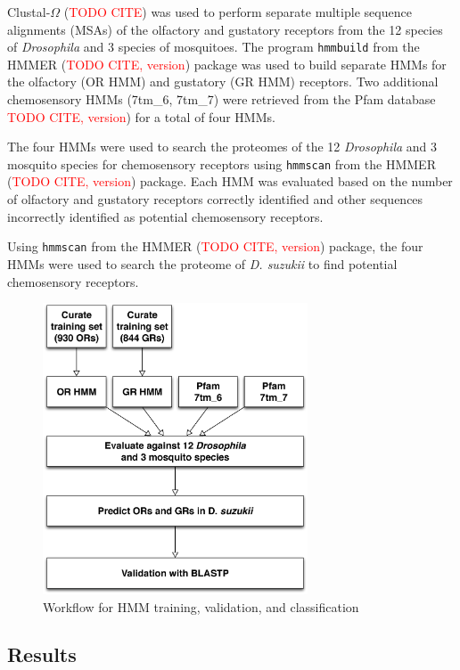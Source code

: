 Clustal-$\Omega$ (\textcolor{red}{TODO CITE}) was used to perform separate multiple sequence alignments (MSAs) of the olfactory and gustatory receptors from the 12 species of \emph{Drosophila} and 3 species of mosquitoes.  The program \texttt{hmmbuild} from the HMMER (\textcolor{red}{TODO CITE, version}) package was used to build separate HMMs for the olfactory (OR HMM) and gustatory (GR HMM) receptors.  Two additional chemosensory HMMs (7tm\_6, 7tm\_7) were retrieved from the Pfam database \textcolor{red}{TODO CITE, version}) for a total of four HMMs.

The four HMMs were used to search the proteomes of the 12 \emph{Drosophila} and 3 mosquito species for chemosensory receptors using \texttt{hmmscan} from the HMMER (\textcolor{red}{TODO CITE, version}) package.  Each HMM was evaluated based on the number of olfactory and gustatory receptors correctly identified and other sequences incorrectly identified as potential chemosensory receptors.

Using \texttt{hmmscan} from the HMMER (\textcolor{red}{TODO CITE, version}) package, the four HMMs were used to search the proteome of \emph{D. suzukii} to find potential chemosensory receptors.

\begin{figure}[H]
  \centering
  \includegraphics[width=0.7\textwidth]{figures/chemosensory/hmm_workflow}
  \caption{Workflow for HMM training, validation, and classification}
  \label{fig:chemosensory:hmm-workflow}
\end{figure}

\subsection{Results}

